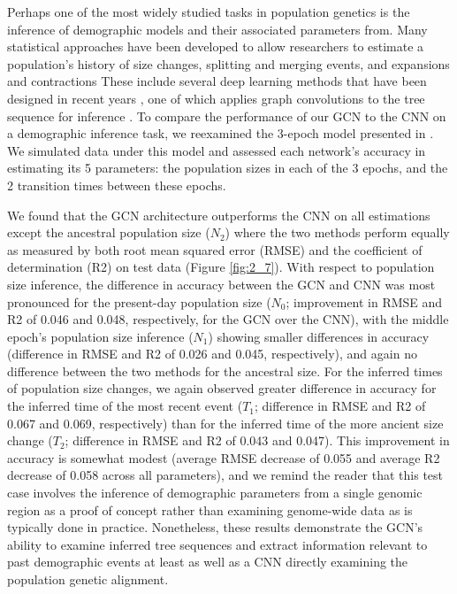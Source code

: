 Perhaps one of the most widely studied tasks in population genetics is the inference of demographic models and their associated parameters from. Many statistical approaches have been developed to allow researchers to estimate a population's history of size changes, splitting and merging events, and expansions and contractions \cite{browningAccurateNonparametricEstimation2015,excoffierFastsimcoal2DemographicInference2021,gutenkunstInferringJointDemographic2009,gutenkunstInferringJointDemographic2009,gutenkunstDiffusionApproximationsDemographic2010,kammEfficientlyInferringDemographic2020,liInferenceHumanPopulation2011,santiagoRecentDemographicHistory2020,terhorstRobustScalableInference2017} These include several deep learning methods that have been designed in recent years \cite{sanchezDeepLearningPopulation2021,wangAutomaticInferenceDemographic2021}, one of which applies graph convolutions to the tree sequence for inference \cite{korfmannSimultaneousInferenceDemography2023}. To compare the performance of our GCN to the CNN on a demographic inference task, we reexamined the 3-epoch model presented in \cite{flagelUnreasonableEffectivenessConvolutional2019}. We simulated data under this model and assessed each network's accuracy in estimating its 5 parameters: the population sizes in each of the 3 epochs, and the 2 transition times between these epochs. 

We found that the GCN architecture outperforms the CNN on all estimations except the ancestral population size ($N_2$) where the two methods perform equally as measured by both root mean squared error (RMSE) and the coefficient of determination (R2) on test data (Figure \ref{fig:2_7}). With respect to population size inference, the difference in accuracy between the GCN and CNN was most pronounced for the present-day population size ($N_0$; improvement in RMSE and R2 of 0.046 and 0.048, respectively, for the GCN over the CNN), with the middle epoch's population size inference ($N_1$) showing smaller differences in accuracy (difference in RMSE and R2 of 0.026 and 0.045, respectively), and again no difference between the two methods for the ancestral size. For the inferred times of population size changes, we again observed greater difference in accuracy for the inferred time of the most recent event ($T_1$; difference in RMSE and R2 of 0.067 and 0.069, respectively) than for the inferred time of the more ancient size change ($T_2$; difference in RMSE and R2 of 0.043 and 0.047). This improvement in accuracy is somewhat modest (average RMSE decrease of 0.055 and average R2 decrease of 0.058 across all parameters), and we remind the reader that this test case involves the inference of demographic parameters from a single genomic region as a proof of concept rather than examining genome-wide data as is typically done in practice. Nonetheless, these results demonstrate the GCN's ability to examine inferred tree sequences and extract information relevant to past demographic events at least as well as a CNN directly examining the population genetic alignment. 

